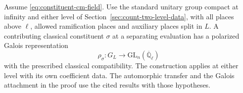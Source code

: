 \begin{proposition}
\label{prop:polarized-separating-constituent}
Assume \eqref{eq:constituent-cm-field}. Use the standard unitary group compact at infinity and either level of Section~\ref{sec:count-two-level-data}, with all places above \(\ell\), allowed ramification places and auxiliary places split in \(L\). A contributing classical constituent \(\sigma\) at a separating evaluation has a polarized Galois representation 
\[
 \rho_\sigma:G_L\longrightarrow\mathrm{GL}_n(\overline{\mathbb Q}_\ell)
\]
 with the prescribed classical compatibility.
The construction applies at either level with its own coefficient
data. The automorphic transfer and the Galois attachment in the
proof use the cited results with those hypotheses.
\end{proposition}

